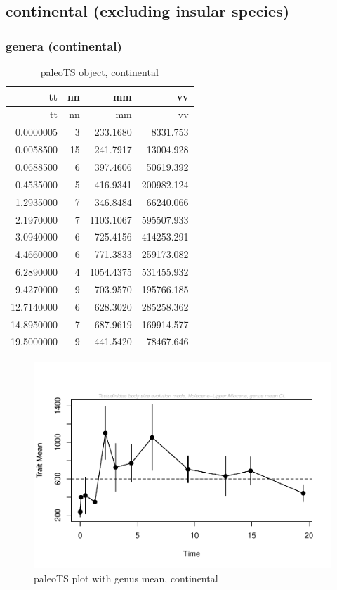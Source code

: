 \documentclass[]{article}
\begin{document}
\newpage

\subsection{continental (excluding insular
species)}\label{continental-excluding-insular-species}

\subsubsection{genera (continental)}\label{genera-continental}

\begin{longtable}[]{@{}rrrr@{}}
\caption{paleoTS object, continental}\tabularnewline
\toprule
tt & nn & mm & vv\tabularnewline
\midrule
\endfirsthead
\toprule
tt & nn & mm & vv\tabularnewline
\midrule
\endhead
0.0000005 & 3 & 233.1680 & 8331.753\tabularnewline
0.0058500 & 15 & 241.7917 & 13004.928\tabularnewline
0.0688500 & 6 & 397.4606 & 50619.392\tabularnewline
0.4535000 & 5 & 416.9341 & 200982.124\tabularnewline
1.2935000 & 7 & 346.8484 & 66240.066\tabularnewline
2.1970000 & 7 & 1103.1067 & 595507.933\tabularnewline
3.0940000 & 6 & 725.4156 & 414253.291\tabularnewline
4.4660000 & 6 & 771.3833 & 259173.082\tabularnewline
6.2890000 & 4 & 1054.4375 & 531455.932\tabularnewline
9.4270000 & 9 & 703.9570 & 195766.185\tabularnewline
12.7140000 & 6 & 628.3020 & 285258.362\tabularnewline
14.8950000 & 7 & 687.9619 & 169914.577\tabularnewline
19.5000000 & 9 & 441.5420 & 78467.646\tabularnewline
\bottomrule
\end{longtable}

\begin{figure}[htbp]
\centering
\includegraphics{MA_JJ_files/figure-latex/paleoTSC-1.pdf}
\caption{paleoTS plot with genus mean, continental}
\end{figure}
\end{document}
